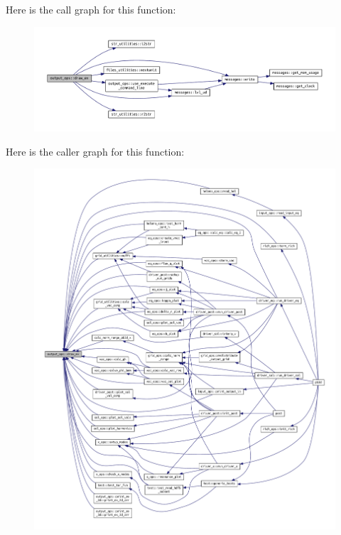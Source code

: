 Here is the call graph for this function\+:\nopagebreak
\begin{figure}[H]
\begin{center}
\leavevmode
\includegraphics[width=350pt]{namespaceoutput__ops_a50bfbb88cc91805469353c3ff47b3e2e_cgraph}
\end{center}
\end{figure}
Here is the caller graph for this function\+:\nopagebreak
\begin{figure}[H]
\begin{center}
\leavevmode
\includegraphics[width=350pt]{namespaceoutput__ops_a50bfbb88cc91805469353c3ff47b3e2e_icgraph}
\end{center}
\end{figure}
\mbox{\label{namespaceoutput__ops_ab0d14194d01ab0534562eab50b37a57a}} 
